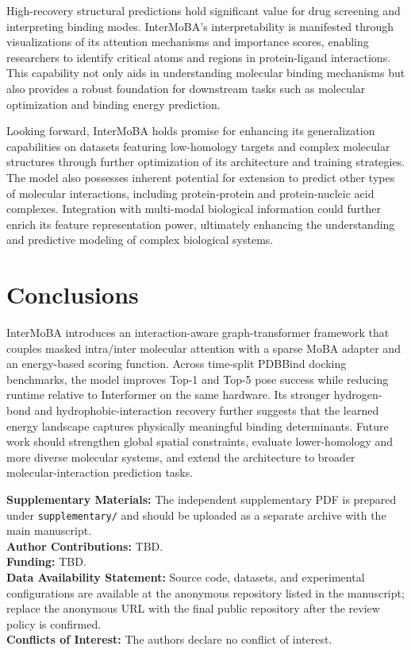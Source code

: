 \documentclass[11pt,a4paper]{article}
\begin{document}
High-recovery structural predictions hold significant value for drug screening and interpreting binding modes. InterMoBA's interpretability is manifested through visualizations of its attention mechanisms and importance scores, enabling researchers to identify critical atoms and regions in protein-ligand interactions. This capability not only aids in understanding molecular binding mechanisms but also provides a robust foundation for downstream tasks such as molecular optimization\cite{wu2024leveraging} and binding energy prediction.

Looking forward, InterMoBA holds promise for enhancing its generalization capabilities on datasets featuring low-homology targets and complex molecular structures through further optimization of its architecture and training strategies. The model also possesses inherent potential for extension to predict other types of molecular interactions, including protein-protein and protein-nucleic acid complexes. Integration with multi-modal biological information could further enrich its feature representation power, ultimately enhancing the understanding and predictive modeling of complex biological systems.
\section{Conclusions}
InterMoBA introduces an interaction-aware graph-transformer framework that couples masked intra/inter molecular attention with a sparse MoBA adapter and an energy-based scoring function. Across time-split PDBBind docking benchmarks, the model improves Top-1 and Top-5 pose success while reducing runtime relative to Interformer on the same hardware. Its stronger hydrogen-bond and hydrophobic-interaction recovery further suggests that the learned energy landscape captures physically meaningful binding determinants. Future work should strengthen global spatial constraints, evaluate lower-homology and more diverse molecular systems, and extend the architecture to broader molecular-interaction prediction tasks.

\vspace{1.5em}
{
\small
\setlength{\parskip}{0.8em}
\noindent\textbf{Supplementary Materials:} The independent supplementary PDF is prepared under \texttt{supplementary/} and should be uploaded as a separate archive with the main manuscript. \\
\noindent\textbf{Author Contributions:} TBD. \\
\noindent\textbf{Funding:} TBD. \\
\noindent\textbf{Data Availability Statement:} Source code, datasets, and experimental configurations are available at the anonymous repository listed in the manuscript; replace the anonymous URL with the final public repository after the review policy is confirmed. \\
\noindent\textbf{Conflicts of Interest:} The authors declare no conflict of interest.
\par}



\end{document}
